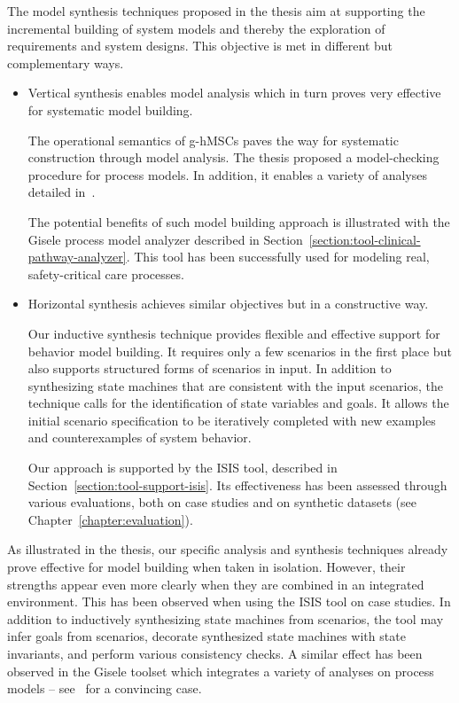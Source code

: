 The model synthesis techniques proposed in the thesis aim at supporting the incremental building of system models and thereby the exploration of requirements and system designs. This objective is met in different but complementary ways.
\begin{itemize}

\item Vertical synthesis enables model analysis which in turn proves very effective for systematic model building.

The operational semantics of g-hMSCs paves the way for systematic construction through model analysis. The thesis proposed a model-checking procedure for process models. In addition, it enables a variety of analyses detailed in~\cite{Damas:2011}.

The potential benefits of such model building approach is illustrated with the Gisele process model analyzer described in Section~\ref{section:tool-clinical-pathway-analyzer}. This tool has been successfully used for modeling real, safety-critical care processes.

\item Horizontal synthesis achieves similar objectives but in a constructive way.

Our inductive synthesis technique provides flexible and effective support for behavior model building. It requires only a few scenarios in the first place but also supports structured forms of scenarios in input. In addition to synthesizing state machines that are consistent with the input scenarios, the technique calls for the identification of state variables and goals. It allows the initial scenario specification to be iteratively completed with new examples and counterexamples of system behavior.

Our approach is supported by the ISIS tool, described in Section~\ref{section:tool-support-isis}. Its effectiveness has been assessed through various evaluations, both on case studies and on synthetic datasets (see Chapter~\ref{chapter:evaluation}).

\end{itemize}

As illustrated in the thesis, our specific analysis and synthesis techniques already prove effective for model building when taken in isolation. However, their strengths appear even more clearly when they are combined in an integrated environment. This has been observed when using the ISIS tool on case studies. In addition to inductively synthesizing state machines from scenarios, the tool may infer goals from scenarios, decorate synthesized state machines with state invariants, and perform various consistency checks. A similar effect has been observed in the Gisele toolset which integrates a variety of analyses on process models -- see~\cite{Damas:2011} for a convincing case.




